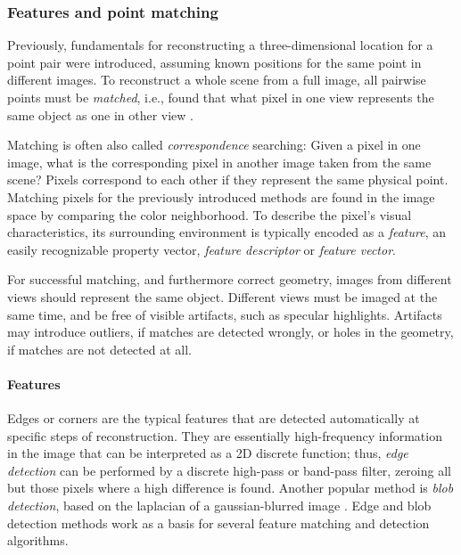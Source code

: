 
\subsubsection{Features and point matching} %


Previously, fundamentals for reconstructing a three-dimensional location for a point pair were introduced, assuming known positions for the same point in different images.
To reconstruct a whole scene from a full image, all pairwise points must be \emph{matched}, i.e., found that what pixel in one view represents the same object as one in other view \cite[ch. 4]{szeliski10vision}.

Matching is often also called \emph{correspondence} searching:
Given a pixel in one image, what is the corresponding pixel in another image taken from the same scene?
Pixels correspond to each other if they represent the same physical point.
Matching pixels for the previously introduced methods are found in the image space by comparing the color neighborhood.
To describe the pixel's visual characteristics, its surrounding environment is typically encoded as a \emph{feature}, an easily recognizable property vector, \emph{feature descriptor} or \emph{feature vector}.
\cite[ch. 4]{szeliski10vision}

For successful matching, and furthermore correct geometry, images from different views should represent the same object.
Different views must be imaged at the same time, and be free of visible artifacts, such as specular highlights.
Artifacts may introduce outliers, if matches are detected wrongly, or holes in the geometry, if matches are not detected at all.

\paragraph{Features}
Edges or corners are the typical features that are detected automatically at specific steps of reconstruction.
They are essentially high-frequency information in the image that can be interpreted as a 2D discrete function;
thus, \emph{edge detection} can be performed by a discrete high-pass or band-pass filter, zeroing all but those pixels where a high difference is found. \cite{marr1980theory}
Another popular method is \emph{blob detection}, based on the laplacian of a gaussian-blurred image \cite{?}.
Edge and blob detection methods work as a basis for several feature matching and detection algorithms. %

